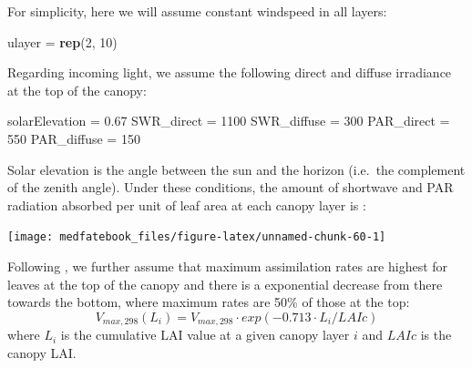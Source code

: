 \documentclass[]{book}
\newenvironment{Shaded}{\begin{snugshade}}{\end{snugshade}}
\newcommand{\KeywordTok}[1]{\textcolor[rgb]{0.13,0.29,0.53}{\textbf{#1}}}
\newcommand{\DecValTok}[1]{\textcolor[rgb]{0.00,0.00,0.81}{#1}}
\newcommand{\FloatTok}[1]{\textcolor[rgb]{0.00,0.00,0.81}{#1}}
\newcommand{\StringTok}[1]{\textcolor[rgb]{0.31,0.60,0.02}{#1}}
\newcommand{\NormalTok}[1]{#1}
\begin{document}
For simplicity, here we will assume constant windspeed in all layers:

\begin{Shaded}
\begin{Highlighting}[]
\NormalTok{ulayer =}\StringTok{ }\KeywordTok{rep}\NormalTok{(}\DecValTok{2}\NormalTok{, }\DecValTok{10}\NormalTok{)}
\end{Highlighting}
\end{Shaded}

Regarding incoming light, we assume the following direct and diffuse irradiance at the top of the canopy:

\begin{Shaded}
\begin{Highlighting}[]
\NormalTok{solarElevation =}\StringTok{ }\FloatTok{0.67}
\NormalTok{SWR_direct =}\StringTok{ }\DecValTok{1100}
\NormalTok{SWR_diffuse =}\StringTok{ }\DecValTok{300}
\NormalTok{PAR_direct =}\StringTok{ }\DecValTok{550}
\NormalTok{PAR_diffuse =}\StringTok{ }\DecValTok{150}
\end{Highlighting}
\end{Shaded}

Solar elevation is the angle between the sun and the horizon (i.e.~the complement of the zenith angle). Under these conditions, the amount of shortwave and PAR radiation absorbed per unit of leaf area at each canopy layer is \citep{Anten2016}:

\begin{center}\texttt{[image: medfatebook\_files/figure-latex/unnamed-chunk-60-1]} \end{center}

Following \citet{DePury1997}, we further assume that maximum assimilation rates are highest for leaves at the top of the canopy and there is a exponential decrease from there towards the bottom, where maximum rates are 50\% of those at the top:
\begin{equation}
V_{max,298}(L_i) =V_{max,298}\cdot exp(-0.713\cdot L_i/LAIc)   
\end{equation}
where \(L_i\) is the cumulative LAI value at a given canopy layer \(i\) and \(LAIc\) is the canopy LAI.
\end{document}

